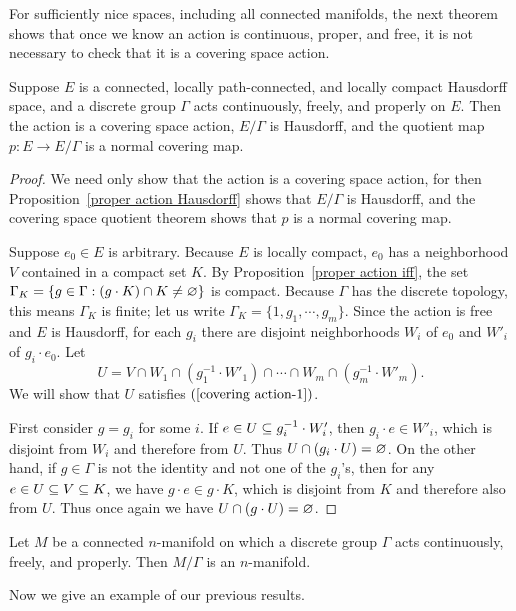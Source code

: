 For sufficiently nice spaces, including all connected manifolds, the next theorem shows that once we know an action is continuous, proper, and free, it is not necessary to check that it is a covering space action.
\begin{theorem}
Suppose $E$ is a connected, locally path-connected, and locally compact Hausdorff space, and a discrete group $\Gamma$ acts continuously, freely, and properly on $E$. Then the action is a covering space action, $E/\Gamma$ is Hausdorff, and the quotient map $p:E\to E/\Gamma$ is a normal covering map.
\end{theorem}
\begin{proof}
We need only show that the action is a covering space action, for then Proposition~\ref{proper action Hausdorff} shows that $E/\Gamma$ is Hausdorff, and the covering space quotient theorem shows that $p$ is a normal covering map.\par
Suppose $e_0\in E$ is arbitrary. Because $E$ is locally compact, $e_0$ has a neighborhood $V$ contained in a compact set $K$. By Proposition~\ref{proper action iff}, the set $\Gamma_K=\{g\in\Gamma:(g\cdot K)\cap K\neq\varnothing\}$ is compact. Because $\Gamma$ has the discrete topology, this means $\Gamma_K$ is finite; let us write $\Gamma_K=\{1,g_1,\cdots,g_m\}$. Since the action is free and $E$ is Hausdorff, for each $g_i$ there are disjoint neighborhoods $W_i$ of $e_0$ and $W'_i$ of $g_i\cdot e_0$. Let
\[U=V\cap W_1\cap(g_1^{-1}\cdot W'_1)\cap\cdots\cap W_m\cap(g_m^{-1}\cdot W'_m).\]
We will show that $U$ satisfies $(\ref{covering action-1})$.\par
First consider $g=g_i$ for some $i$. If $e\in U\subseteq g_i^{-1}\cdot W'_i$, then $g_i\cdot e\in W'_i$, which is disjoint from $W_i$ and therefore from $U$. Thus $U\cap(g_i\cdot U)=\varnothing$. On the other hand, if $g\in\Gamma$ is not the identity and not one of the $g_i$'s, then for any $e\in U\subseteq V\subseteq K$, we have $g\cdot e\in g\cdot K$, which is disjoint from $K$ and therefore also from $U$. Thus once
again we have $U\cap(g\cdot U)=\varnothing$.
\end{proof}
\begin{corollary}
Let $M$ be a connected $n$-manifold on which a discrete group $\Gamma$ acts continuously, freely, and properly. Then $M/\Gamma$ is an $n$-manifold.
\end{corollary}
Now we give an example of our previous results.
